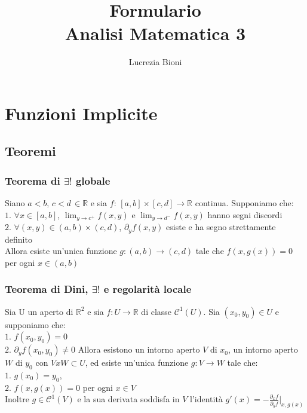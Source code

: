 \documentclass{article} %
\title{%
    \Huge Formulario \\
    \Large Analisi Matematica 3}
\author{Lucrezia Bioni} %
\date{} %
\begin{document}
    \maketitle

    \section{Funzioni Implicite}
    \subsection{Teoremi}
    \subsubsection*{Teorema di $\exists !$ globale}
    Siano $a<b, \, c<d \, \in \mathbb{R}$ e sia $f: \, [a,b] \times [c,d] \to \mathbb{R}$ continua. Supponiamo che: \\
    $1.$ $\forall x \in [a,b]$, $\lim_{y \to c^+} f(x,y)$ e $\lim_{y \to d^-} f(x,y)$ hanno segni discordi \\
    $2.$ $\forall (x,y) \in (a,b) \times (c,d)$, $\partial_yf(x,y)$ esiste e ha segno strettamente definito \\
    Allora esiste un'unica funzione $g:(a,b) \to (c,d)$ tale che $f(x , g(x))=0$ per ogni $x \in (a,b)$


    \subsubsection*{Teorema di Dini, $\exists !$ e regolarità locale}
    Sia U un aperto di $\mathbb{R}^2$ e sia $f:U \to \mathbb{R}$ di classe $\mathcal{C}^1\left(U\right)$. Sia $(x_0,y_0)\in U$ e supponiamo che: \\
    $1.$ $f(x_0,y_0)=0$ \\
    $2.$ $\partial_y f(x_0,y_0) \neq 0$
    Allora esistono un intorno aperto $V$ di $x_0$, un intorno aperto $W$ di $y_0$ con $V x W \subset U$, ed esiste un'unica funzione $g: V \to W$ tale che: \\
    $1.$ $g(x_0)=y_0$, \\
    $2.$ $f(x,g(x))=0$ per ogni $x \in V$ \\
    Inoltre $g \in \mathcal{C}^1(V)$ e la sua derivata soddisfa in $V$ l'identità $g'(x) = - \frac{\partial_x f}{\partial_y f}|_{x,g(x)}$ 
    
\end{document}
